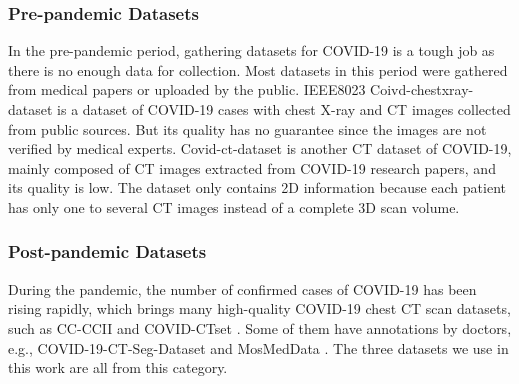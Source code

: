 \documentclass[letterpaper]{article}
\begin{document}
\subsubsection{Pre-pandemic Datasets}
In the pre-pandemic period, gathering datasets for COVID-19 is a tough job as there is no enough data for collection. Most datasets in this period were gathered from medical papers or uploaded by the public. IEEE8023 Coivd-chestxray-dataset \cite{cohen2020covid} is a dataset of COVID-19 cases with chest X-ray and CT images collected from public sources. But its quality has no guarantee since the images are not verified by medical experts. Covid-ct-dataset \cite{zhao2020covidctdataset} is another CT dataset of COVID-19, mainly composed of CT images extracted from COVID-19 research papers, and its quality is low. The dataset only contains 2D information because each patient has only one to several CT images instead of a complete 3D scan volume.

\subsubsection{Post-pandemic Datasets}
During the pandemic, the number of confirmed cases of COVID-19 has been rising rapidly, which brings many high-quality COVID-19 chest CT scan datasets, such as CC-CCII \cite{cell_covid} and COVID-CTset \cite{covid-ctset}. Some of them have annotations by doctors, e.g., COVID-19-CT-Seg-Dataset \cite{COVID-19-CT-Seg-Dataset} and MosMedData \cite{mosmeddata}. The three datasets we use in this work are all from this category. 


\end{document}
